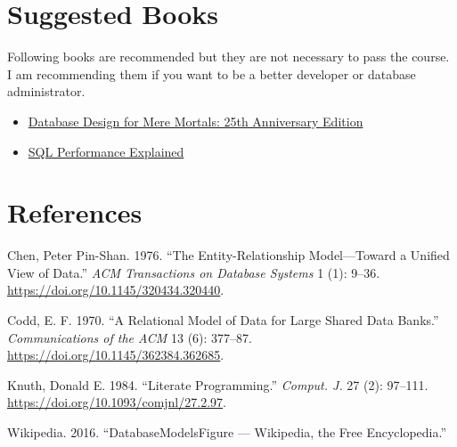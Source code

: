 \documentclass[
  letterpaper,
  DIV=11,
  numbers=noendperiod]{scrreprt}
\newlength{\cslhangindent}
\newenvironment{CSLReferences}[2] %
 {\begin{list}{}{%
  \setlength{\itemindent}{0pt}
  \setlength{\leftmargin}{0pt}
  \setlength{\parsep}{0pt}
  \ifodd #1
   \setlength{\leftmargin}{\cslhangindent}
   \setlength{\itemindent}{-1\cslhangindent}
  \fi
  \setlength{\itemsep}{#2\baselineskip}}}
 {\end{list}}
\begin{document}

\chapter{Suggested Books}\label{suggested-books}

Following books are recommended but they are not necessary to pass the
course. I am recommending them if you want to be a better developer or
database administrator.

\begin{itemize}
\item
  \href{https://www.amazon.com/Database-Design-Mere-Mortals-Anniversary/dp/0136788041}{Database
  Design for Mere Mortals: 25th Anniversary Edition}
\item
  \href{https://use-the-index-luke.com/}{SQL Performance Explained}
\end{itemize}


\chapter*{References}\label{references-1}


\label{refs}
\begin{CSLReferences}{1}{0}
Chen, Peter Pin-Shan. 1976. {``The Entity-Relationship Model---Toward a
Unified View of Data.''} \emph{ACM Transactions on Database Systems} 1
(1): 9--36. \url{https://doi.org/10.1145/320434.320440}.

Codd, E. F. 1970. {``A Relational Model of Data for Large Shared Data
Banks.''} \emph{Communications of the ACM} 13 (6): 377--87.
\url{https://doi.org/10.1145/362384.362685}.

Knuth, Donald E. 1984. {``Literate Programming.''} \emph{Comput. J.} 27
(2): 97--111. \url{https://doi.org/10.1093/comjnl/27.2.97}.

Wikipedia. 2016. {``DatabaseModelsFigure --- Wikipedia{,} the Free
Encyclopedia.''}

\end{CSLReferences}
\end{document}
